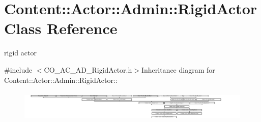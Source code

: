 \hypertarget{classContent_1_1Actor_1_1Admin_1_1RigidActor}{
\section{Content::Actor::Admin::RigidActor Class Reference}
\label{classContent_1_1Actor_1_1Admin_1_1RigidActor}
}


rigid actor  


{\ttfamily \#include $<$CO\_\-AC\_\-AD\_\-RigidActor.h$>$}Inheritance diagram for Content::Actor::Admin::RigidActor::\begin{figure}[H]
\begin{center}
\leavevmode
\includegraphics[height=1.50307cm]{classContent_1_1Actor_1_1Admin_1_1RigidActor}
\end{center}
\end{figure}
